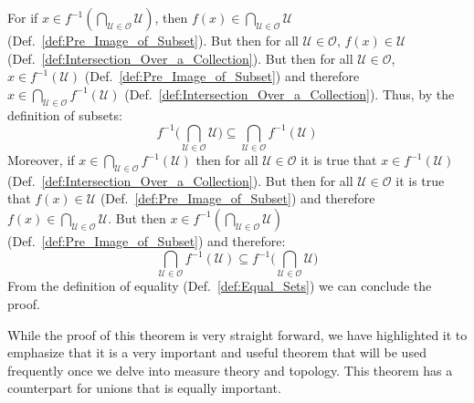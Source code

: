     \begin{bproof}
        For if
        $x\in{f}^{\minus{1}}(\bigcap_{\mathcal{U}\in\mathcal{O}}\mathcal{U})$,
        then $f(x)\in\bigcap_{\mathcal{U}\in\mathcal{O}}\mathcal{U}$
        (Def.~\ref{def:Pre_Image_of_Subset}). But then for all
        $\mathcal{U}\in\mathcal{O}$, $f(x)\in\mathcal{U}$
        (Def.~\ref{def:Intersection_Over_a_Collection}). But then for all
        $\mathcal{U}\in\mathcal{O}$, $x\in{f}^{\minus{1}}(\mathcal{U})$
        (Def.~\ref{def:Pre_Image_of_Subset}) and therefore
        $x\in\bigcap_{\mathcal{U}\in\mathcal{O}}f^{\minus{1}}(\mathcal{U})$
        (Def.~\ref{def:Intersection_Over_a_Collection}). Thus, by the definition
        of subsets:
        \begin{equation}
            f^{\minus{1}}\Big(
                \bigcap_{\mathcal{U}\in\mathcal{O}}\mathcal{U}\Big)
            \subseteq\bigcap_{\mathcal{U}\in\mathcal{O}}
                f^{\minus{1}}(\mathcal{U})
        \end{equation}
        Moreover, if
        $x\in\bigcap_{\mathcal{U}\in\mathcal{O}}f^{\minus{1}}(\mathcal{U})$ then
        for all $\mathcal{U}\in\mathcal{O}$ it is true that
        $x\in{f}^{\minus{1}}(\mathcal{U})$
        (Def.~\ref{def:Intersection_Over_a_Collection}). But then for all
        $\mathcal{U}\in\mathcal{O}$ it is true that $f(x)\in\mathcal{U}$
        (Def.~\ref{def:Pre_Image_of_Subset}) and therefore
        $f(x)\in\bigcap_{\mathcal{U}\in\mathcal{O}}\mathcal{U}$. But then
        $x\in{f}^{\minus{1}}(\bigcap_{\mathcal{U}\in\mathcal{O}}\mathcal{U})$
        (Def.~\ref{def:Pre_Image_of_Subset}) and therefore:
        \begin{equation}
            \bigcap_{\mathcal{U}\in\mathcal{O}}f^{\minus{1}}(\mathcal{U})
            \subseteq{f}^{\minus{1}}\Big(
                \bigcap_{\mathcal{U}\in\mathcal{O}}\mathcal{U}\Big)
        \end{equation}
        From the definition of equality
        (Def.~\ref{def:Equal_Sets}) we can conclude the proof.
    \end{bproof}
    While the proof of this theorem is very straight forward, we have
    highlighted it to emphasize that it is a very important and useful theorem
    that will be used frequently once we delve into measure theory and topology.
    This theorem has a counterpart for unions that is equally important.




